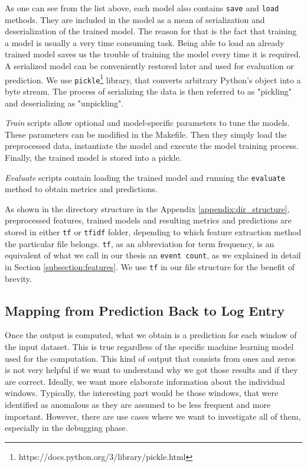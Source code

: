 As one can see from the list above, each model also contains \texttt{save} and \texttt{load} methods. They are included in the model as a mean of serialization and deserialization of the trained model. The reason for that is the fact that training a model is usually a very time consuming task. Being able to load an already trained model saves us the trouble of training the model every time it is required. A serialized model can be conveniently restored later and used for evaluation or prediction. We use \texttt{pickle}\footnote{https://docs.python.org/3/library/pickle.html} library, that converts arbitrary Python's object into a byte stream. The process of serializing the data is then referred to as "pickling" and deserializing as "unpickling".

\textit{Train} scripts allow optional and model-specific parameters to tune the models. These parameters can be modified in the Makefile. Then they simply load the preprocessed data, instantiate the model and execute the model training process. Finally, the trained model is stored into a pickle. 
 
\textit{Evaluate} scripts contain loading the trained model and running the \texttt{\justify evaluate} method to obtain metrics and predictions.

As shown in the directory structure in the Appendix \ref{appendix:dir_structure}, preprocessed features, trained models and resulting metrics and predictions are stored in either \texttt{tf} or \texttt{tfidf} folder, depending to which feature extraction method the particular file belongs. \texttt{tf}, as an abbreviation for term frequency, is an equivalent of what we call in our thesis an \texttt{event count}, as we explained in detail in Section \ref{subsection:features}. We use \texttt{tf} in our file structure for the benefit of brevity.

\subsection{Mapping from Prediction Back to Log Entry}
\label{methodology:mapping-predictions-back}
Once the output is computed, what we obtain is a prediction for each window of the input dataset. This is true regardless of the specific machine learning model used for the computation. 
This kind of output that consists from ones and zeros is not very helpful if we want to understand why we got those results and if they are correct. Ideally, we want more elaborate information about the individual windows.
Typically, the interesting part would be those windows, that were identified as anomalous as they are assumed to be less frequent and more important. However, there are use cases where we want to investigate all of them, especially in the debugging phase. 

